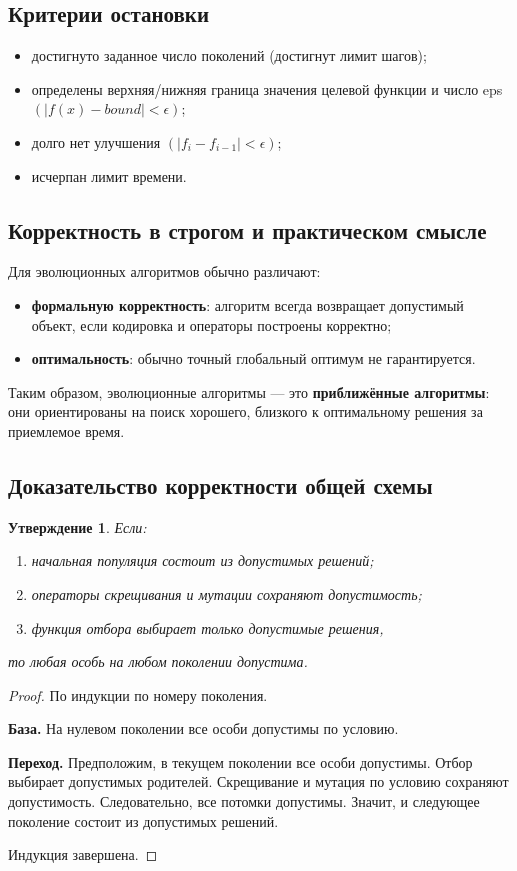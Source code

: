 \documentclass[12pt,a4paper]{article}
\theoremstyle{definition}
\theoremstyle{plain}
\newtheorem{proposition}{Утверждение}[section]
\begin{document}
\subsection{Критерии остановки}
\begin{itemize}
\item достигнуто заданное число поколений (достигнут лимит шагов);
\item определены верхняя/нижняя граница значения целевой функции и число eps $(|f(x) - bound| < \epsilon)$;
\item долго нет улучшения $(|f_i - f_{i-1}| < \epsilon)$;
\item исчерпан лимит времени.
\end{itemize}

\subsection{Корректность в строгом и практическом смысле}
Для эволюционных алгоритмов обычно различают:
\begin{itemize}
\item \textbf{формальную корректность}: алгоритм всегда возвращает допустимый объект, если кодировка и операторы построены корректно;
\item \textbf{оптимальность}: обычно точный глобальный оптимум не гарантируется.
\end{itemize}

Таким образом, эволюционные алгоритмы --- это \textbf{приближённые алгоритмы}: они ориентированы на поиск хорошего, близкого к оптимальному решения за приемлемое время.

\subsection{Доказательство корректности общей схемы}
\begin{proposition}
Если:
\begin{enumerate}
\item начальная популяция состоит из допустимых решений;
\item операторы скрещивания и мутации сохраняют допустимость;
\item функция отбора выбирает только допустимые решения,
\end{enumerate}
то любая особь на любом поколении допустима.
\end{proposition}

\begin{proof}
По индукции по номеру поколения.

\textbf{База.} На нулевом поколении все особи допустимы по условию.

\textbf{Переход.} Предположим, в текущем поколении все особи допустимы. Отбор выбирает допустимых родителей. Скрещивание и мутация по условию сохраняют допустимость. Следовательно, все потомки допустимы. Значит, и следующее поколение состоит из допустимых решений.

Индукция завершена.
\end{proof}
\end{document}
